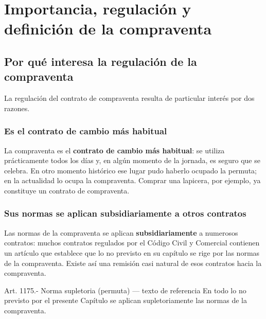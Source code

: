 \documentclass[12pt,oneside]{book}
\begin{document}
\tableofcontents
\clearpage
\mainmatter

\chapter[Importancia, regulación y definición]{Importancia, regulación y definición de la compraventa}

\section{Por qué interesa la regulación de la compraventa}

La regulación del contrato de compraventa resulta de particular interés por dos razones.

\subsection{Es el contrato de cambio más habitual}

La compraventa es el \textbf{contrato de cambio más habitual}: se utiliza prácticamente todos los días y, en algún momento de la jornada, es seguro que se celebra. En otro momento histórico ese lugar pudo haberlo ocupado la permuta; en la actualidad lo ocupa la compraventa. Comprar una lapicera, por ejemplo, ya constituye un contrato de compraventa.

\subsection{Sus normas se aplican subsidiariamente a otros contratos}

Las normas de la compraventa se aplican \textbf{subsidiariamente} a numerosos contratos: muchos contratos regulados por el Código Civil y Comercial contienen un artículo que establece que lo no previsto en su capítulo se rige por las normas de la compraventa. Existe así una remisión casi natural de esos contratos hacia la compraventa.

\begin{norma}{Art. 1175.- Norma supletoria (permuta) --- texto de referencia}
En todo lo no previsto por el presente Capítulo se aplican supletoriamente las normas de la compraventa.
\end{norma}
\end{document}
